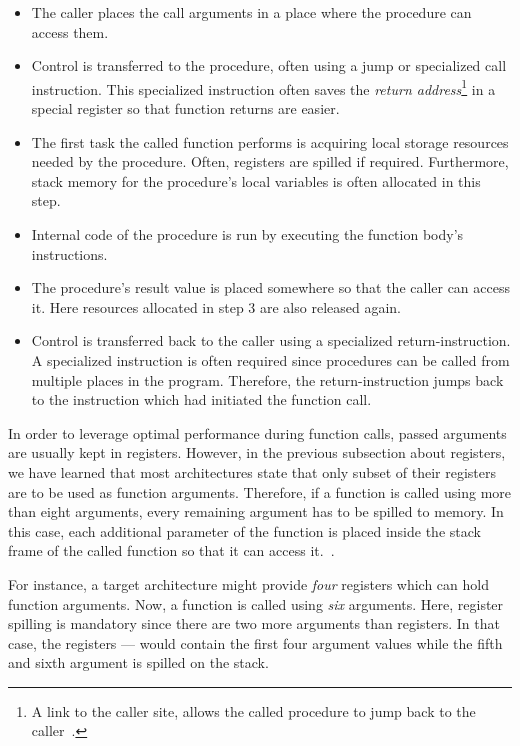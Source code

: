 \begin{itemize}
	\item The caller places the call arguments in a place where the procedure can access them.
	\item Control is transferred to the procedure, often using a jump or specialized call instruction.
	      This specialized instruction often saves the \emph{return address}\footnote{A link to the caller site, allows the called procedure to jump back to the caller~\cite[p.~99]{Patterson2017-zq}.} in a special register so that function returns are easier.
	\item The first task the called function performs is acquiring local storage resources needed by the procedure.
	      Often, registers are spilled if required.
	      Furthermore, stack memory for the procedure's local variables is often allocated in this step.
	\item Internal code of the procedure is run by executing the function body's instructions.
	\item The procedure's result value is placed somewhere so that the caller can access it.
	      Here resources allocated in step 3 are also released again.
	\item Control is transferred back to the caller using a specialized return-instruction.
	      A specialized instruction is often required since procedures can be called from multiple places in the program.
	      Therefore, the return-instruction jumps back to the instruction which had initiated the function call.
\end{itemize}

In order to leverage optimal performance during function calls, passed arguments are usually kept in registers.
However, in the previous subsection about registers, we have learned that most architectures state that only subset of their registers are to be used as function arguments.
Therefore, if a function is called using more than eight arguments, every remaining argument has to be spilled to memory.
In this case, each additional parameter of the function is placed inside the stack frame of the called function so that it can access it.~\cite[p.~98]{Patterson2017-zq}.

For instance, a target architecture might provide \emph{four} registers which can hold function arguments.
Now, a function is called using \emph{six} arguments.
Here, register spilling is mandatory since there are two more arguments than registers.
In that case, the registers  —  would contain the first four argument values while the fifth and sixth argument is spilled on the stack.

